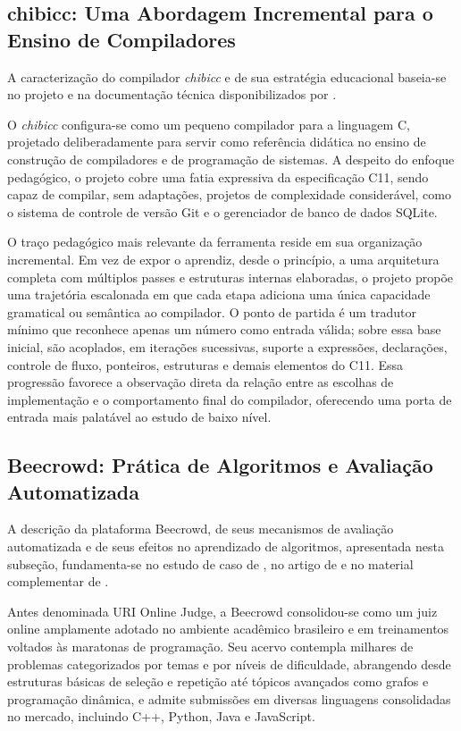 \subsection{chibicc: Uma Abordagem Incremental para o Ensino de Compiladores}

A caracterização do compilador \textit{chibicc} e de sua estratégia educacional baseia-se no projeto e na documentação técnica disponibilizados por .

O \textit{chibicc} configura-se como um pequeno compilador para a linguagem C, projetado deliberadamente para servir como referência didática no ensino de construção de compiladores e de programação de sistemas. A despeito do enfoque pedagógico, o projeto cobre uma fatia expressiva da especificação C11, sendo capaz de compilar, sem adaptações, projetos de complexidade considerável, como o sistema de controle de versão Git e o gerenciador de banco de dados SQLite.

O traço pedagógico mais relevante da ferramenta reside em sua organização incremental. Em vez de expor o aprendiz, desde o princípio, a uma arquitetura completa com múltiplos passes e estruturas internas elaboradas, o projeto propõe uma trajetória escalonada em que cada etapa adiciona uma única capacidade gramatical ou semântica ao compilador. O ponto de partida é um tradutor mínimo que reconhece apenas um número como entrada válida; sobre essa base inicial, são acoplados, em iterações sucessivas, suporte a expressões, declarações, controle de fluxo, ponteiros, estruturas e demais elementos do C11. Essa progressão favorece a observação direta da relação entre as escolhas de implementação e o comportamento final do compilador, oferecendo uma porta de entrada mais palatável ao estudo de baixo nível.

\subsection{Beecrowd: Prática de Algoritmos e Avaliação Automatizada}

A descrição da plataforma Beecrowd, de seus mecanismos de avaliação automatizada e de seus efeitos no aprendizado de algoritmos, apresentada nesta subseção, fundamenta-se no estudo de caso de , no artigo de  e no material complementar de .

Antes denominada URI Online Judge, a Beecrowd consolidou-se como um juiz online amplamente adotado no ambiente acadêmico brasileiro e em treinamentos voltados às maratonas de programação. Seu acervo contempla milhares de problemas categorizados por temas e por níveis de dificuldade, abrangendo desde estruturas básicas de seleção e repetição até tópicos avançados como grafos e programação dinâmica, e admite submissões em diversas linguagens consolidadas no mercado, incluindo C++, Python, Java e JavaScript.

